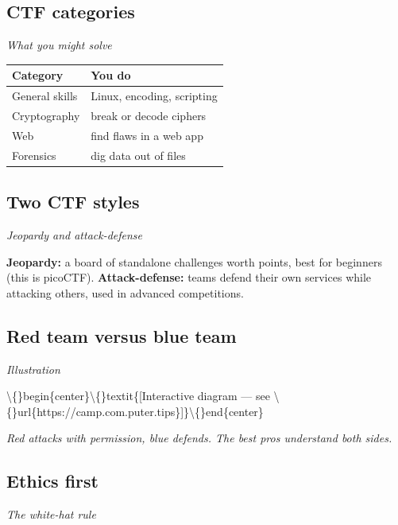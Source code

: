 \documentclass[12pt,openany]{book}
\begin{document}
\medskip

\subsection*{CTF categories}
{\small\itshape\color{gray}What you might solve}


\begin{center}\small\begin{tabular}{p{6.5cm}p{6.5cm}}\toprule
\textbf{Category} & \textbf{You do} \\ \midrule
General skills & Linux, encoding, scripting \\
Cryptography & break or decode ciphers \\
Web & find flaws in a web app \\
Forensics & dig data out of files \\
\bottomrule\end{tabular}\end{center}

\medskip

\subsection*{Two CTF styles}
{\small\itshape\color{gray}Jeopardy and attack-defense}


\textbf{Jeopardy:} a board of standalone challenges worth points, best for beginners (this is picoCTF). \textbf{Attack-defense:} teams defend their own services while attacking others, used in advanced competitions.

\medskip

\subsection*{Red team versus blue team}
{\small\itshape\color{gray}Illustration}

\textbackslash\{\}begin\{center\}\textbackslash\{\}textit\{[Interactive diagram --- see \textbackslash\{\}url\{https://camp.com.puter.tips\}]\}\textbackslash\{\}end\{center\}

{\small\itshape\color{gray}Red attacks with permission, blue defends. The best pros understand both sides.}

\medskip

\subsection*{Ethics first}
{\small\itshape\color{gray}The white-hat rule}
\end{document}
